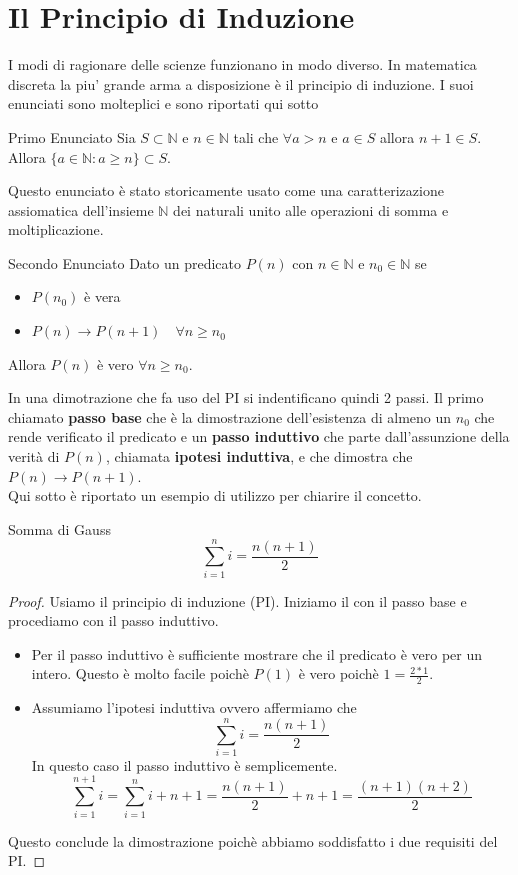 \section{Il Principio di Induzione}
I modi di ragionare delle scienze funzionano in modo diverso. In matematica discreta la piu' grande arma a disposizione è il principio di induzione. I suoi enunciati sono molteplici e sono riportati qui sotto
\begin{definition}{Primo Enunciato}
    Sia $S\subset\mathbb{N}$ e $n\in \mathbb{N}$ tali che $\forall a > n$ e $a\in S$ allora $n+1 \in S$. Allora $\{ a\in \mathbb{N} : a \ge n\} \subset S$.
\end{definition}
Questo enunciato è stato storicamente usato come una caratterizazione assiomatica dell'insieme $\mathbb{N}$ dei naturali unito alle operazioni di somma e moltiplicazione.
\begin{definition}{Secondo Enunciato}
    Dato un predicato $P(n)$ con $n\in \mathbb{N}$ e $n_0 \in \mathbb{N}$ se \begin{itemize}
        \item $P(n_0)$ è vera
        \item $P(n) \rightarrow P(n+1) \quad \forall n\ge n_0 $
    \end{itemize}
    Allora $P(n)$ è vero $\forall n\ge n_0$.
\end{definition}
In una dimotrazione che fa uso del PI si indentificano quindi 2 passi. Il primo chiamato \textbf{passo base} che è la dimostrazione dell'esistenza di almeno un $n_0$ che rende verificato il predicato e un \textbf{passo induttivo} che parte dall'assunzione della verità di $P(n)$, chiamata \textbf{ipotesi induttiva}, e che dimostra che $P(n) \rightarrow P(n+1)$. \\
Qui sotto è riportato un esempio di utilizzo per chiarire il concetto.
\begin{theorem}{Somma di Gauss}
    \[\sum^n_{i=1}i = \frac{n(n+1)}{2}\]
\end{theorem}
\begin{proof}
    Usiamo il principio di induzione (PI). Iniziamo il con il passo base e procediamo con il passo induttivo.
    \begin{itemize}
        \item Per il passo induttivo è sufficiente mostrare che il predicato è vero per un intero. Questo è molto facile poichè $P(1)$ è vero poichè $1 = \frac{2*1}{2}$.
        \item Assumiamo l'ipotesi induttiva ovvero affermiamo che \[\sum^n_{i=1}i = \frac{n(n+1)}{2}\] In questo caso il passo induttivo è semplicemente.
        \[\sum^{n+1}_{i=1}i = \sum^{n}_{i=1}i + n+1 = \frac{n(n+1)}{2} + n+1 = \frac{(n+1)(n+2)}{2} \]
    \end{itemize}
    Questo conclude la dimostrazione poichè abbiamo soddisfatto i due requisiti del PI.
\end{proof}
